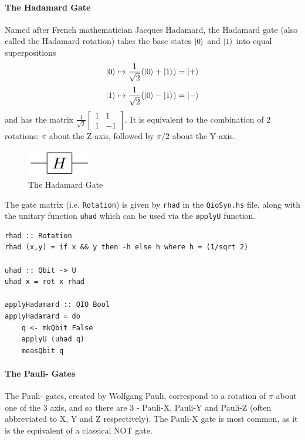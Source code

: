 \documentclass[a4paper,10pt, titlepage, twoside]{article}
\begin{document}
\paragraph{The Hadamard Gate}
Named after French mathematician Jacques Hadamard, the Hadamard gate (also called the Hadamard rotation) takes the base states $\ket{0}$ and $\ket{1}$ into equal superpositions
$$\ket{0} \mapsto \frac{1}{\sqrt{2}}(\ket{0} + \ket{1}) = \ket{+}$$
$$\ket{1} \mapsto \frac{1}{\sqrt{2}}(\ket{0} - \ket{1}) = \ket{-}$$
and has the matrix $\frac{1}{\sqrt{2}} 
\begin{bmatrix}
	1 & 1 \\
	1 & -1 
\end{bmatrix} $.
It is equivalent to the combination of 2 rotations: $\pi$ about the Z-axis, followed by $\pi/2$ about the Y-axis.
\begin{figure}[H]
	\centering
	\includegraphics[width=0.25\textwidth]{hadamard}
	\caption{The Hadamard Gate}
\end{figure}
The gate matrix (i.e. \texttt{Rotation}) is given by \texttt{rhad} in the \texttt{QioSyn.hs} file, along with the unitary function \texttt{uhad} which can be used via the \texttt{applyU} function.
\begin{verbatim}
rhad :: Rotation
rhad (x,y) = if x && y then -h else h where h = (1/sqrt 2)

uhad :: Qbit -> U
uhad x = rot x rhad

applyHadamard :: QIO Bool
applyHadamard = do
    q <- mkQbit False
    applyU (uhad q)
    measQbit q
\end{verbatim}

\paragraph{The Pauli- Gates}
The Pauli- gates, created by Wolfgang Pauli, correspond to a rotation of $\pi$ about one of the 3 axis, and so there are 3 - Pauli-X, Pauli-Y and Pauli-Z (often abbreviated to X, Y and Z respectively). The Pauli-X gate is most common, as it is the equivalent of a classical NOT gate.
\end{document}
